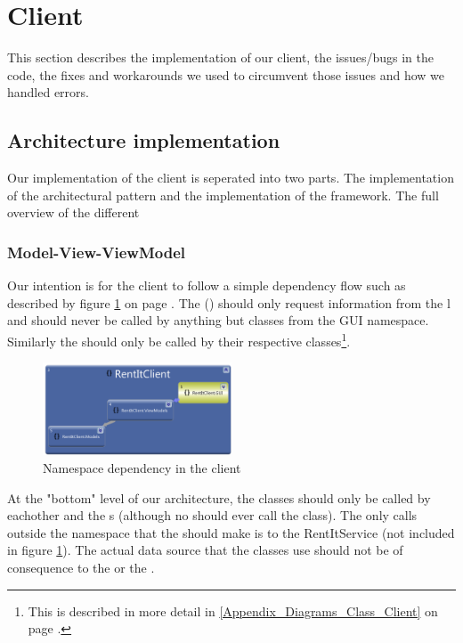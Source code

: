 \section{Client}
\label{Implementation_Client}
This section describes the implementation of our client, the issues/bugs in the code, the fixes and workarounds we used to circumvent those issues and how we handled errors.
\subsection{Architecture implementation}
\label{Implementation_Client_Architecture}
Our implementation of the client is seperated into two parts. The implementation of the  architectural pattern and the implementation of the  framework. The full overview of the different 
\subsubsection{Model-View-ViewModel}
\label{Implementation_Client_Architecture_MVVM}
Our intention is for the client to follow a simple dependency flow such as described by figure \ref{fig:Implementation_Client_Architecture_MVVM_Namespace} on page \pageref{fig:Implementation_Client_Architecture_MVVM_Namespace}. The  () should only request information from the l and should never be called by anything but classes from the GUI namespace. Similarly the  should only be called by their respective  classes\footnote{This is described in more detail in \ref{Appendix_Diagrams_Class_Client} on page \pageref{Appendix_Diagrams_Class_Client}.}. 
\begin{figure}[h!]
  \centering
    \includegraphics[width=0.5\textwidth]{Parts/Images/Implementation/NamespaceDependency}
  \caption{Namespace dependency in the client}
\label{fig:Implementation_Client_Architecture_MVVM_Namespace}
\end{figure}

At the "bottom" level of our architecture, the  classes should only be called by eachother and the s (although no  should ever call the  class). The only calls outside the namespace that the  should make is to the RentItService (not included in figure \ref{fig:Implementation_Client_Architecture_MVVM_Namespace}). The actual data source that the  classes use should not be of consequence to the  or the . 

